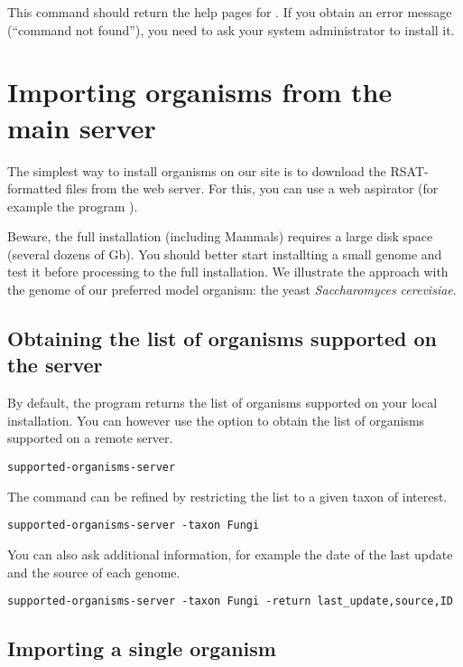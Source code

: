 This command should return the help pages for .  If you
obtain an error message (``command not found''), you need to ask your
system administrator to install it.

\section{Importing organisms from the \RSAT main server}

The simplest way to install organisms on our \RSAT site is to download
the RSAT-formatted files from the web server. For this, you can use a
web aspirator (for example the program ). 

Beware, the full installation (including Mammals) requires a large
disk space (several dozens of Gb). You should better start installting
a small genome and test it before processing to the full
installation. We illustrate the approach with the genome of our
preferred model organism: the yeast \textit{Saccharomyces cerevisiae}.

\subsection{Obtaining the list of organisms supported on the \RSAT server}

By default, the program  returns the list
of organisms supported on your local \RSAT installation. You can
however use the option  to obtain the list of
organisms supported on a remote server.


\begin{lstlisting}
supported-organisms-server
\end{lstlisting}

The command can be refined by restricting the list to a given taxon of
interest.

\begin{lstlisting}
supported-organisms-server -taxon Fungi
\end{lstlisting}

You can also ask additional information, for example the date of the
last update and the source of each genome.

\begin{lstlisting}
supported-organisms-server -taxon Fungi -return last_update,source,ID
\end{lstlisting}


\subsection{Importing a single organism}


